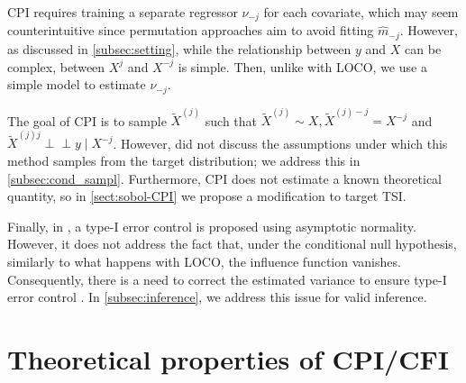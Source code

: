 \documentclass{article}
\theoremstyle{plain}
\theoremstyle{definition}
\theoremstyle{remark}
\newcommand{\indep}{\perp\!\!\!\perp}
\begin{document}

CPI requires training a separate regressor $\widehat{\nu}_{-j}$ for each covariate, which may seem counterintuitive since permutation approaches aim to avoid fitting $\widehat{m}_{-j}$. However, as discussed in \cref{subsec:setting}, while the relationship between $y$ and $X$ can be complex, between $X^j$ and $X^{-j}$ is simple. Then, unlike with LOCO, we use a simple model to estimate $\nu_{-j}$. 

The goal of CPI is to sample $\widetilde{X}^{(j)}$ such that $\widetilde{X}^{(j)} \sim X, \widetilde{X}^{(j)-j} = X^{-j}$ and $\widetilde{X}^{(j)j} \indep y \mid X^{-j}$. 
%
However, \citet{chamma2024statistically} did not discuss the assumptions under which this method samples from the target distribution;
%
we address this in \cref{subsec:cond_sampl}.
Furthermore, CPI does not estimate a known theoretical quantity, so in \cref{sect:sobol-CPI} we propose a modification to target TSI.


Finally, in \citet{chamma2024statistically}, a type-I error control is proposed using asymptotic normality. However, it does not address the fact that, under the conditional null hypothesis, similarly to what happens with LOCO, the influence function vanishes. Consequently, there is a need to correct the estimated variance to ensure type-I error control \citep{williamson2023general, Dai2024, locoVSShapley}. In \cref{subsec:inference}, we address this issue for valid inference.




\section{Theoretical properties of CPI/CFI}
\end{document}
